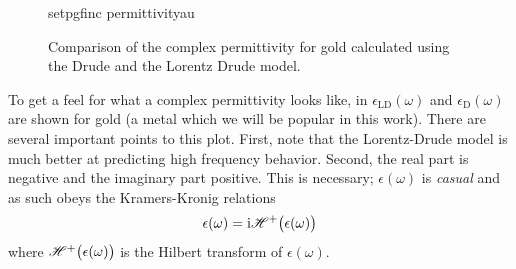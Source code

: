 \begin{figure}[ht]
\centering
{setpgfinc}
{permittivityau}
\caption{Comparison of the complex permittivity for gold calculated using the Drude
and the Lorentz Drude model.}
\label{fig:permittivityau}
\end{figure}

To get a feel for what a complex permittivity looks like, in
 $\epsilon_\mathrm{LD}(\omega)$ and
$\epsilon_\mathrm{D}(\omega)$ are shown for gold (a metal which we will be
popular in this work).  There are several important points to this plot.
First, note that the Lorentz-Drude model is much better at predicting high
frequency behavior.  Second, the real part is negative and the
imaginary part positive.  This is necessary; $\epsilon(\omega)$ is
\textit{casual} and as such obeys the Kramers-Kronig relations
\begin{align}
\epsilon(\omega)={\mathrm{i}} {\mathscr{H}^{+}\bigl(\epsilon(\omega)\bigr)}
\end{align}
where ${\mathscr{H}^{+}\bigl(\epsilon(\omega)\bigr)}$ is the Hilbert transform of
$\epsilon(\omega)$.
